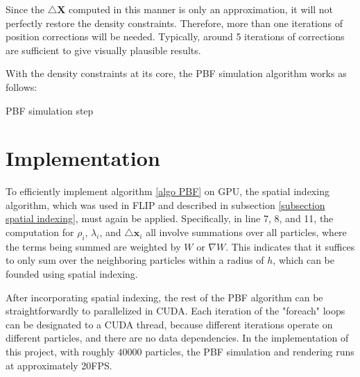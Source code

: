 Since the $\triangle \textbf{X}$ computed in this manner is only an approximation, it will not perfectly restore the density constraints. Therefore, more than one iterations of position corrections will be needed. Typically, around 5 iterations of corrections are sufficient to give visually plausible results. 

With the density constraints at its core, the PBF simulation algorithm works as follows:

\begin{algorithm}[H]
    \label{algo PBF}

    \SetAlgoLined

    \caption{PBF simulation step}
\end{algorithm}


\section{Implementation}
To efficiently implement algorithm \ref{algo PBF} on GPU, the spatial indexing algorithm, which was used in FLIP and described in subsection \ref{subsection spatial indexing}, must again be applied. Specifically, in line 7, 8, and 11, the computation for $\rho_i$, $\lambda_i$, and $\triangle\textbf{x}_i$ all involve summations over all particles, where the terms being summed are weighted by $W$ or $\nabla W$. This indicates that it suffices to only sum over the neighboring particles within a radius of $h$, which can be founded using spatial indexing.


After incorporating spatial indexing, the rest of the PBF algorithm can be straightforwardly to parallelized in CUDA. Each iteration of the "foreach" loops can be designated to a CUDA thread, because different iterations operate on different particles, and there are no data dependencies. In the implementation of this project, with roughly $40000$ particles, the PBF simulation and rendering runs at approximately 20FPS.



